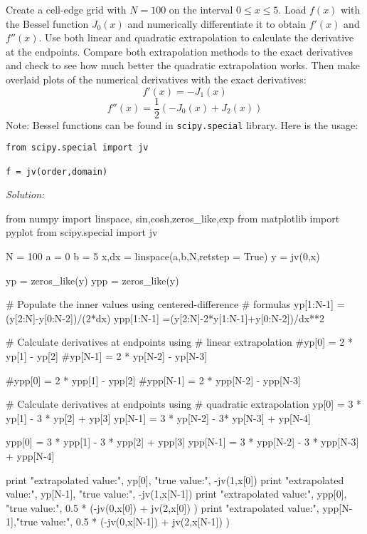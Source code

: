 
\begin{enumerate}
\prob \label{P:1.Deriv} 

    Create a cell-edge grid with $N=100$ on the interval $0 \le x
    \le 5$. Load $f(x)$ with the Bessel function $J_0(x)$ and
    numerically differentiate it to obtain $f'(x)$ and $f''(x)$.
    Use both linear and quadratic extrapolation to calculate the
    derivative at the endpoints. Compare both extrapolation
    methods to the exact derivatives and check to see how much
    better the quadratic extrapolation works. Then make overlaid
    plots of the numerical derivatives with the exact
    derivatives:
    \[
        f'(x) = -J_1(x)
    \]
    \[
        f''(x) = \frac{1}{2} \left( -J_0(x) + J_2(x) \right)
    \]
Note: Bessel functions can be found in \texttt{scipy.special}
library.  Here is the usage:
\begin{Verbatim}
from scipy.special import jv

f = jv(order,domain)
\end{Verbatim}
\ifsolutions
\textit{Solution:}\\
\begin{codeexample}
\begin{VerbatimOut}{\listingFile}
from numpy import linspace, sin,cosh,zeros_like,exp
from matplotlib import pyplot
from scipy.special import jv

N = 100
a = 0
b = 5
x,dx = linspace(a,b,N,retstep = True)
y = jv(0,x)

yp = zeros_like(y)
ypp = zeros_like(y)

# Populate the inner values using centered-difference
# formulas
yp[1:N-1] =(y[2:N]-y[0:N-2])/(2*dx)
ypp[1:N-1] =(y[2:N]-2*y[1:N-1]+y[0:N-2])/dx**2

# Calculate derivatives at endpoints using
# linear extrapolation
#yp[0] = 2 * yp[1] - yp[2]
#yp[N-1] = 2 * yp[N-2] - yp[N-3]

#ypp[0] = 2 * ypp[1] - ypp[2]
#ypp[N-1] = 2 * ypp[N-2] - ypp[N-3]

# Calculate derivatives at endpoints using
# quadratic extrapolation
yp[0] = 3 * yp[1] - 3 * yp[2] + yp[3]
yp[N-1] = 3 * yp[N-2] - 3* yp[N-3] + yp[N-4]

ypp[0] = 3 * ypp[1] - 3 * ypp[2] + ypp[3]
ypp[N-1] = 3 * ypp[N-2] - 3 * ypp[N-3] + ypp[N-4]

print "extrapolated value:", yp[0],   "true value:", -jv(1,x[0])
print "extrapolated value:", yp[N-1], "true value:", -jv(1,x[N-1])
print "extrapolated value:", ypp[0],  "true value:", 0.5 * (-jv(0,x[0]) + jv(2,x[0]) )
print "extrapolated value:", ypp[N-1],"true value:", 0.5 * (-jv(0,x[N-1]) + jv(2,x[N-1]) )



\end{VerbatimOut}
\end{codeexample}
\end{enumerate}

